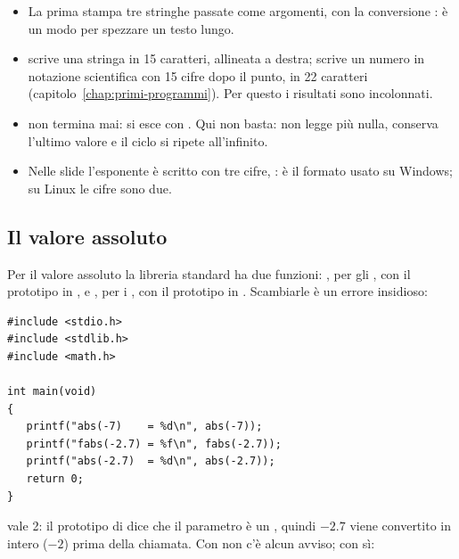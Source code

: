 \begin{itemize}
  \item La prima  stampa tre stringhe passate come argomenti, con
        la conversione : è un modo per spezzare un testo lungo.
  \item {} scrive una stringa in 15 caratteri, allineata a destra;
         scrive un numero in notazione scientifica con 15
        cifre dopo il punto, in 22 caratteri (capitolo~\ref{chap:primi-programmi}).
        Per questo i risultati sono incolonnati.
  \item {} non termina mai: si esce con . Qui
         non basta:  non legge più nulla,
         conserva l'ultimo valore e il ciclo si ripete all'infinito.
  \item Nelle slide l'esponente è scritto con tre cifre, : è il
        formato usato su Windows; su Linux le cifre sono due.
\end{itemize}

\subsection{Il valore assoluto}

Per il valore assoluto la libreria standard ha due funzioni:
, per gli , con il prototipo in , e
, per i , con il prototipo in .
Scambiarle è un errore insidioso:

\begin{affianco}[0.5][c]
\begin{lstlisting}[style=c, name=assoluto.c]
#include <stdio.h>
#include <stdlib.h>
#include <math.h>

int main(void)
{
   printf("abs(-7)    = %d\n", abs(-7));
   printf("fabs(-2.7) = %f\n", fabs(-2.7));
   printf("abs(-2.7)  = %d\n", abs(-2.7));
   return 0;
}
\end{lstlisting}
\risultato
{}
\end{affianco}

 vale 2: il prototipo di  dice che il parametro è
un , quindi $-2.7$ viene convertito in intero ($-2$) prima della
chiamata. Con  non c'è alcun avviso; con  sì:

